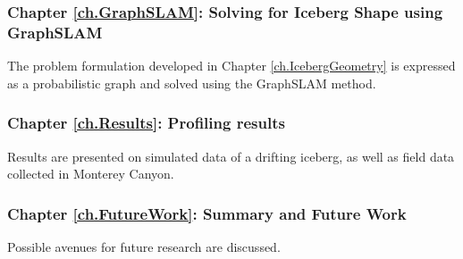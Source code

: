 \subsubsection*{Chapter \ref{ch.GraphSLAM}: Solving for Iceberg Shape using GraphSLAM} The problem formulation developed in Chapter \ref{ch.IcebergGeometry} is expressed as a probabilistic graph and solved using the GraphSLAM method.

\subsubsection*{Chapter \ref{ch.Results}: Profiling results} Results are presented on simulated data of a drifting iceberg, as well as field data collected in Monterey Canyon. 

\subsubsection*{Chapter \ref{ch.FutureWork}: Summary and Future Work}
Possible avenues for future research are discussed.